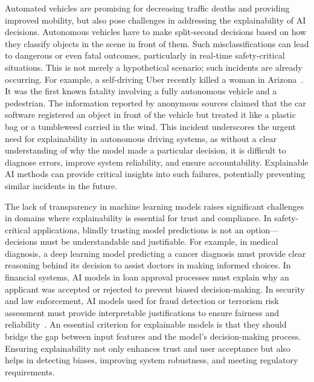 Automated vehicles are promising for decreasing traffic deaths and providing improved mobility, but also pose challenges in addressing the explainability of AI decisions. Autonomous vehicles have to make split-second decisions based on how they classify objects in the scene in front of them. Such misclassifications can lead to dangerous or even fatal outcomes, particularly in real-time safety-critical situations. This is not merely a hypothetical scenario; such incidents are already occurring. For example, a self-driving Uber recently killed a woman in Arizona~\autocite{marshall2019uber}. It was the first known fatality involving a fully autonomous vehicle and a pedestrian. The information reported by anonymous sources claimed that the car software registered an object in front of the vehicle but treated it like a plastic bag or a tumbleweed carried in the wind. This incident underscores the urgent need for explainability in autonomous driving systems, as without a clear understanding of why the model made a particular decision, it is difficult to diagnose errors, improve system reliability, and ensure accountability. Explainable AI methods can provide critical insights into such failures, potentially preventing similar incidents in the future.


The lack of transparency in machine learning models raises significant challenges in domains where explainability is essential for trust and compliance. In safety-critical applications, blindly trusting model predictions is not an option—decisions must be understandable and justifiable. For example, in medical diagnosis, a deep learning model predicting a cancer diagnosis must provide clear reasoning behind its decision to assist doctors in making informed choices. In financial systems, AI models in loan approval processes must explain why an applicant was accepted or rejected to prevent biased decision-making. In security and law enforcement, AI models used for fraud detection or terrorism risk assessment must provide interpretable justifications to ensure fairness and reliability~\autocite{ribeiro2016ML}. An essential criterion for explainable models is that they should bridge the gap between input features and the model’s decision-making process. Ensuring explainability not only enhances trust and user acceptance but also helps in detecting biases, improving system robustness, and meeting regulatory requirements.

